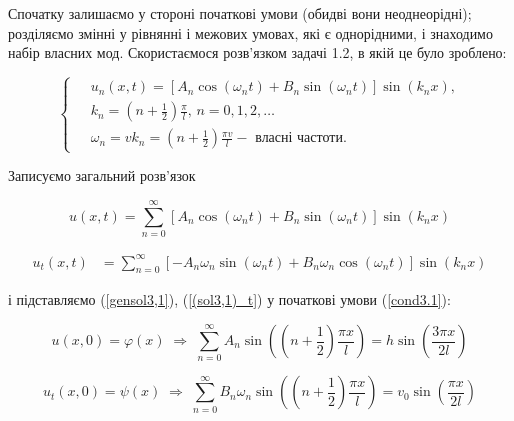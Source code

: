 Спочатку залишаємо у стороні початкові умови (обидві вони неоднеорідні); розділяємо змінні у рівнянні і межових умовах, які є однорідними, і знаходимо набір власних мод. Скористаємося розв'язком задачі 1.2, в якій це було зроблено:

\begin{equation}
    \left\{ \begin{aligned} \label{mode3,1}
        \;&u_n(x,t) = \left[A_n\cos(\omega_n t) + B_n\sin(\omega_n t)\right] \sin(k_n x), \\
        &k_n = (n + \frac{1}{2})\frac{\pi}{l}, \, n = 0, 1, 2,\ldots\\
        &\omega_n = vk_n = (n + \frac{1}{2})\frac{\pi v}{l} - \text{ власні частоти}.
    \end{aligned}\right.
\end{equation}

Записуємо загальний розв'язок

\begin{equation} \label{gensol3,1}
    u(x,t) = \sum^{\infty}_{n=0} \left[A_n\cos(\omega_n t) + B_n\sin(\omega_n t)\right] \sin(k_n x)
\end{equation}

\begin{equation} \label{(sol3,1)_t}
    \begin{aligned}
        u_t(x,t) &= 
   \sum^{\infty}_{n=0}\left[-A_n\omega_n\sin(\omega_n t) + B_n\omega_n\cos(\omega_n t)\right] \sin(k_n x)  
    \end{aligned}
\end{equation}

і підставляємо (\ref{gensol3,1}), (\ref{(sol3,1)_t}) у початкові умови (\ref{cond3.1}):

\begin{equation} \label{init-pos3,1}
    u(x,0) = \varphi(x) \;\Rightarrow\; \sum^{\infty}_{n=0} A_n\sin\left((n + \frac{1}{2}) \frac{\pi x}{l} \right) = h \sin \left( \frac{3 \pi x}{2l} \right)
\end{equation}

\begin{equation} \label{init-vel3,1}
    u_t(x,0) = \psi(x) \;\Rightarrow\; \sum^{\infty}_{n=0} B_n \omega_n \sin\left((n + \frac{1}{2}) \frac{\pi x}{l} \right) = v_0 \sin \left( \frac{ \pi x}{2l} \right)
\end{equation}

